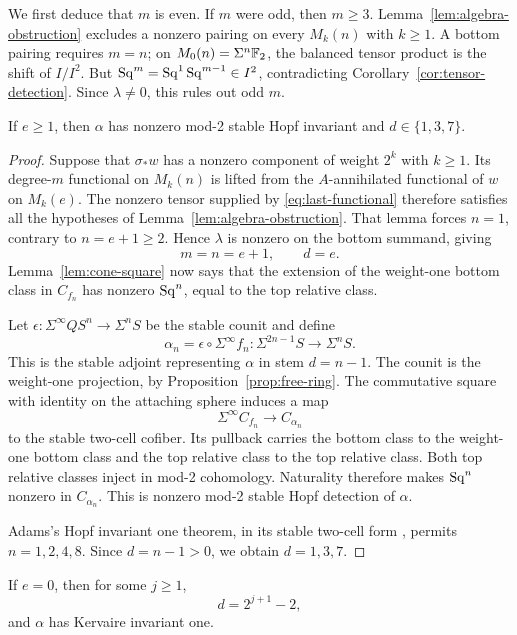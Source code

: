 We first deduce that \(m\) is even. If \(m\) were odd, then
\(m\ge3\). Lemma~\ref{lem:algebra-obstruction} excludes a nonzero
pairing on every \(M_k(n)\) with \(k\ge1\). A bottom pairing
requires \(m=n\); on \(M_0(n)=\Sigma^n\mathbb F_2\), the balanced tensor
product is the shift of \(I/I^2\). But
\(\operatorname{Sq}^m=\operatorname{Sq}^1\operatorname{Sq}^{m-1}\in I^2\), contradicting
Corollary~\ref{cor:tensor-detection}. Since \(\lambda\ne0\), this
rules out odd \(m\).

\begin{proposition}\label{prop:hopf-case}
If \(e\ge1\), then \(\alpha\) has nonzero mod-2 stable Hopf
invariant and \(d\in\{1,3,7\}\).
\end{proposition}

\begin{proof}
Suppose that \(\sigma_*w\) has a nonzero component of weight
\(2^k\) with \(k\ge1\). Its degree-\(m\) functional on
\(M_k(n)\) is lifted from the \(A\)-annihilated functional of
\(w\) on \(M_k(e)\). The nonzero tensor supplied by
\eqref{eq:last-functional} therefore satisfies all the hypotheses of
Lemma~\ref{lem:algebra-obstruction}. That lemma forces \(n=1\),
contrary to \(n=e+1\ge2\). Hence \(\lambda\) is nonzero on the
bottom summand, giving
\[
m=n=e+1,\qquad d=e.
\]
Lemma~\ref{lem:cone-square} now says that the extension of the
weight-one bottom class in \(C_{f_n}\) has nonzero \(\operatorname{Sq}^n\), equal
to the top relative class.

Let \(\epsilon:\Sigma^\infty QS^n\to\Sigma^nS\) be the stable
counit and define
\[
\alpha_n=\epsilon\circ\Sigma^\infty f_n:
\Sigma^{2n-1}S\longrightarrow\Sigma^nS.
\]
This is the stable adjoint representing \(\alpha\) in stem
\(d=n-1\). The counit is the weight-one projection, by
Proposition~\ref{prop:free-ring}. The commutative square with identity
on the attaching sphere induces a map
\[
\Sigma^\infty C_{f_n}\longrightarrow C_{\alpha_n}
\]
to the stable two-cell cofiber. Its pullback carries the bottom class
to the weight-one bottom class and the top relative class to the top
relative class. Both top relative classes inject in mod-2 cohomology.
Naturality therefore makes \(\operatorname{Sq}^n\) nonzero in \(C_{\alpha_n}\).
This is nonzero mod-2 stable Hopf detection of \(\alpha\).

Adams's Hopf invariant one theorem, in its stable two-cell form
\cite[Theorem~1.1.1(d)]{Adams1960}, permits \(n=1,2,4,8\).
Since \(d=n-1>0\), we obtain \(d=1,3,7\).
\end{proof}

\begin{proposition}\label{prop:kervaire-case}
If \(e=0\), then for some \(j\ge1\),
\[
d=2^{j+1}-2,
\]
and \(\alpha\) has Kervaire invariant one.
\end{proposition}

